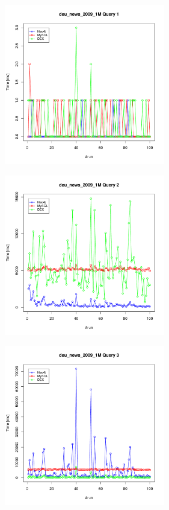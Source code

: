\documentclass[11pt, a4paper, oneside]{article} %
\begin{document}
\begin{appendix}
\begin{landscape} 
	\newpage
	\thispagestyle{empty}
	
	\begin{figure}[ht]
		\begin{minipage}[hbt]{6.5cm}
			\centering
			\includegraphics[width=7cm]{../results/cold caches/images/1M_query1_perf}
			\label{fig:1M_query1_perf}
		\end{minipage}
		\hfill
		\begin{minipage}[hbt]{6.5cm}
			\centering
			\includegraphics[width=7cm]{../results/cold caches/images/1M_query2_perf}
			\label{fig:1M_query2_perf}
		\end{minipage}
		\hfill
		\begin{minipage}[hbt]{6.5cm}
			\centering
			\includegraphics[width=7cm]{../results/cold caches/images/1M_query3_perf}
			\label{fig:1M_query3_perf}
		\end{minipage}
		

\end{figure}
\end{landscape}
\end{appendix}
\end{document}
